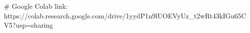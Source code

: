 # Google Colab link: https://colab.research.google.com/drive/1yydP1n9lUOEVyUz_t2wRt43kIGu65CV5?usp=sharing